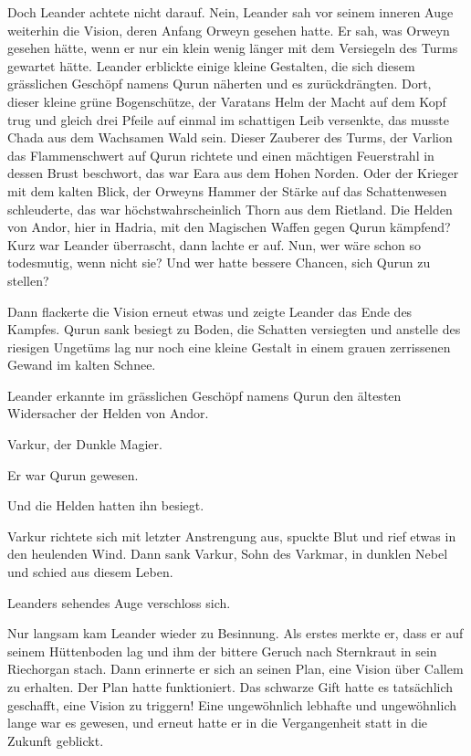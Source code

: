 Doch Leander achtete nicht darauf. Nein, Leander sah vor seinem inneren Auge weiterhin die Vision, deren Anfang Orweyn gesehen hatte. Er sah, was Orweyn gesehen hätte, wenn er nur ein klein wenig länger mit dem Versiegeln des Turms gewartet hätte. Leander erblickte einige kleine Gestalten, die sich diesem grässlichen Geschöpf namens Qurun näherten und es zurückdrängten. Dort, dieser kleine grüne Bogenschütze, der Varatans Helm der Macht auf dem Kopf trug und gleich drei Pfeile auf einmal im schattigen Leib versenkte, das musste Chada aus dem Wachsamen Wald sein. Dieser Zauberer des Turms, der Varlion das Flammenschwert auf Qurun richtete und einen mächtigen Feuerstrahl in dessen Brust beschwort, das war Eara aus dem Hohen Norden. Oder der Krieger mit dem kalten Blick, der Orweyns Hammer der Stärke auf das Schattenwesen schleuderte, das war höchstwahrscheinlich Thorn aus dem Rietland. Die Helden von Andor, hier in Hadria, mit den Magischen Waffen gegen Qurun kämpfend? Kurz war Leander überrascht, dann lachte er auf. Nun, wer wäre schon so todesmutig, wenn nicht sie? Und wer hatte bessere Chancen, sich Qurun zu stellen?

Dann flackerte die Vision erneut etwas und zeigte Leander das Ende des Kampfes. Qurun sank besiegt zu Boden, die Schatten versiegten und anstelle des riesigen Ungetüms lag nur noch eine kleine Gestalt in einem grauen zerrissenen Gewand im kalten Schnee.

Leander erkannte im grässlichen Geschöpf namens Qurun den ältesten Widersacher der Helden von Andor.

Varkur, der Dunkle Magier.

Er war Qurun gewesen.

Und die Helden hatten ihn besiegt.

Varkur richtete sich mit letzter Anstrengung aus, spuckte Blut und rief etwas in den heulenden Wind. Dann sank Varkur, Sohn des Varkmar, in dunklen Nebel und schied aus diesem Leben.

Leanders sehendes Auge verschloss sich.



\trennzeichen



Nur langsam kam Leander wieder zu Besinnung. Als erstes merkte er, dass er auf seinem Hüttenboden lag und ihm der bittere Geruch nach Sternkraut in sein Riechorgan stach. Dann erinnerte er sich an seinen Plan, eine Vision über Callem zu erhalten. Der Plan hatte funktioniert. Das schwarze Gift hatte es tatsächlich geschafft, eine Vision zu triggern! Eine ungewöhnlich lebhafte und ungewöhnlich lange war es gewesen, und erneut hatte er in die Vergangenheit statt in die Zukunft geblickt.

